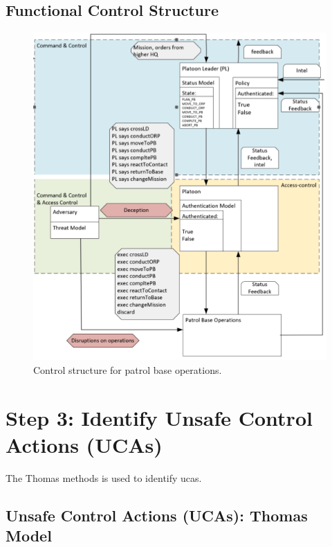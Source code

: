 \documentclass[../../main/main.tex]{subfiles}
\begin{document}
\subsection{Functional Control Structure}
\clearpage

\begin{figure}[ht!]
\begin{center}
\includegraphics[width=0.7\linewidth]{../figures/controlstr1}
\caption{Control structure for patrol base operations.}
\label{controlstr1}
\end{center}
\end{figure}

\clearpage

\section{Step 3: Identify Unsafe Control Actions (UCAs)}\label{chp:stpapb:uca}
The Thomas methods is used to identify \glspl{uca}.

\subsection{Unsafe Control Actions (UCAs): Thomas Model}
\clearpage
\end{document}
